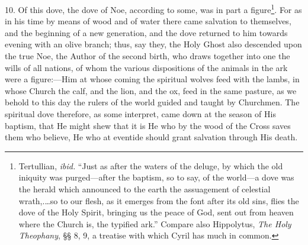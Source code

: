 10. Of this dove, the dove of Noe, according to some, was in part a figure\footnote{Tertullian, \emph{ibid.} “Just as after the waters of the deluge, by which the old iniquity was purged—after the baptism, so to say, of the world—a dove was the herald which announced to the earth the assuagement of celestial wrath,.…so to our flesh, as it emerges from the font after its old sins, flies the dove of the Holy Spirit, bringing us the peace of God, sent out from heaven where the Church is, the typified ark.” Compare also Hippolytus, \emph{The Holy Theophany}, §§ 8, 9, a treatise with which Cyril has much in common.}. For as in his time by means of wood and of water there came salvation to themselves, and the beginning of a new generation, and the dove returned to him towards evening with an olive branch; thus, say they, the Holy Ghost also descended upon the true Noe, the Author of the second birth, who draws together into one the wills of all nations, of whom the various dispositions of the animals in the ark were a figure:—Him at whose coming the spiritual wolves feed with the lambs, in whose Church the calf, and the lion, and the ox, feed in the same pasture, as we behold to this day the rulers of the world guided and taught by Churchmen. The spiritual dove therefore, as some interpret, came down at the season of His baptism, that He might shew that it is He who by the wood of the Cross saves them who believe, He who at eventide should grant salvation through His death.

